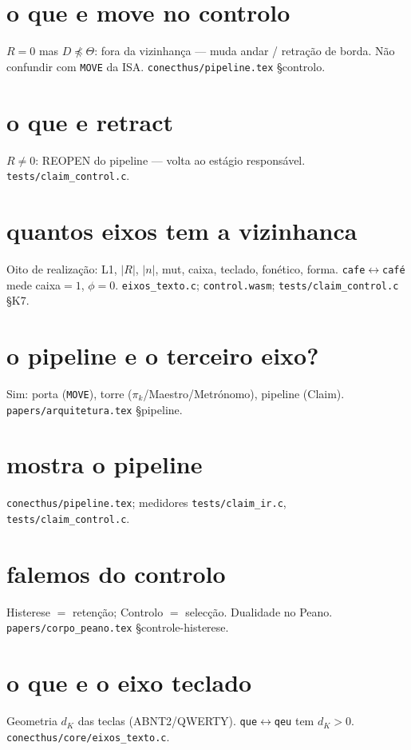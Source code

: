 \documentclass[11pt,a4paper]{article}
\newcommand{\code}[1]{\texttt{\small #1}}
\begin{document}
\section{o que e move no controlo}
$R=0$ mas $D\npreceq\Theta$: fora da vizinhança --- muda andar / retração de
borda. Não confundir com \code{MOVE} da ISA.
\code{conecthus/pipeline.tex} \S controlo.

\section{o que e retract}
$R\neq0$: REOPEN do pipeline --- volta ao estágio responsável.
\code{tests/claim\_control.c}.

\section{quantos eixos tem a vizinhanca}
Oito de realização: L1, $|R|$, $|n|$, mut, caixa, teclado, fonético, forma.
\texttt{cafe}$\leftrightarrow$\texttt{café} mede caixa$=1$, $\phi=0$.
\code{eixos\_texto.c}; \code{control.wasm}; \code{tests/claim\_control.c} \S K7.

\section{o pipeline e o terceiro eixo?}
Sim: porta (\code{MOVE}), torre ($\pi_k$/Maestro/Metrónomo), pipeline (Claim).
\code{papers/arquitetura.tex} \S pipeline.

\section{mostra o pipeline}
\code{conecthus/pipeline.tex}; medidores \code{tests/claim\_ir.c},
\code{tests/claim\_control.c}.

\section{falemos do controlo}
Histerese $=$ retenção; Controlo $=$ selecção. Dualidade no Peano.
\code{papers/corpo\_peano.tex} \S controle-histerese.

\section{o que e o eixo teclado}
Geometria $d_K$ das teclas (ABNT2/QWERTY). \texttt{que}$\leftrightarrow$\texttt{qeu}
tem $d_K>0$. \code{conecthus/core/eixos\_texto.c}.
\end{document}
